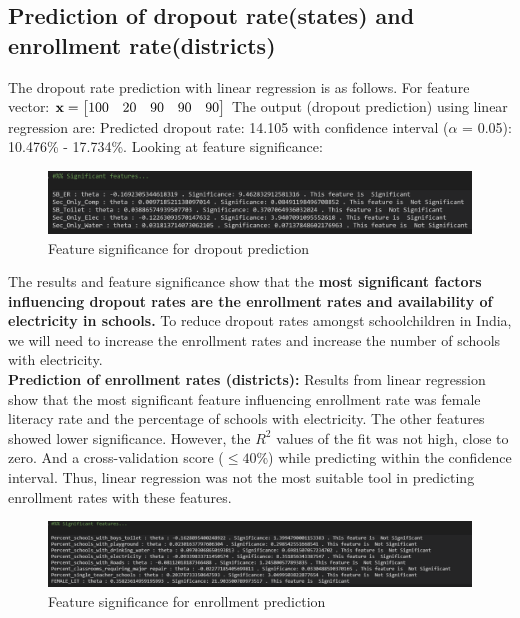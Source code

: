 \documentclass{article}
\def \xx{{\boldsymbol{\rm x}}}
\begin{document}
\subsection{Prediction of dropout rate(states) and enrollment rate(districts)}
The dropout rate prediction with linear regression is as follows. For feature vector: 
$\xx = 
\begin{bmatrix} 
	100 & 20 & 90 & 90 & 90 
\end{bmatrix} $
The output (dropout prediction) using linear regression are: Predicted dropout rate: 14.105 with confidence interval ($\alpha$ = 0.05): 10.476\% - 17.734\%. Looking at feature significance:
\begin{figure}[H]
\centering
  \includegraphics[width=0.6\linewidth]{figures/ResultsDropout2.png}
  \caption{Feature significance for dropout prediction}
  \label{fig:fig5}
\end{figure}
The results and feature significance show that the \textbf{most significant factors influencing dropout rates are the enrollment rates and availability of electricity in schools.} To reduce dropout rates amongst schoolchildren in India, we will need to increase the enrollment rates and increase the number of schools with electricity.\\
\textbf{Prediction of enrollment rates (districts):} Results from linear regression show that the most significant feature influencing enrollment rate was female literacy rate and the percentage of schools with electricity. The other features showed lower significance. However, the $R^{2}$ values of the fit was not high, close to zero. And a cross-validation score ($\leq40\%$) while predicting within the confidence interval. Thus, linear regression was not the most suitable tool in predicting enrollment rates with these features.
\begin{figure}[H]
\centering
  \includegraphics[width=0.6\linewidth]{figures/ResultsEnroll0.png}
  \caption{Feature significance for enrollment prediction}
  \label{fig:fig6}
\end{figure}
\end{document}
